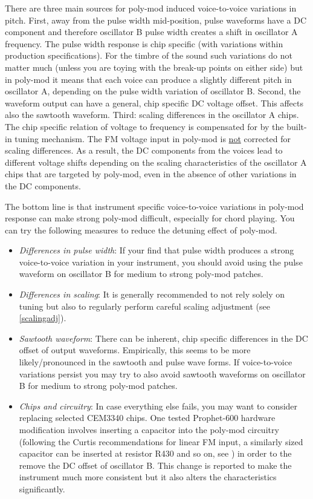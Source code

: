 \documentclass[landscape, 11pt, oneside, twoside]{report}
\newenvironment{flowtext}{\addmargin[0cm]{0cm}}{\endaddmargin} %
\begin{document}
\begin{flowtext}
There are three main sources for poly-mod induced voice-to-voice variations in pitch. First, away from the pulse width mid-position, pulse waveforms have a DC component and therefore oscillator B pulse width creates a shift in oscillator A frequency. The pulse width response is chip specific (with variations within production specifications). For the timbre of the sound such variations do not matter much (unless you are toying with the break-up points on either side) but in poly-mod it means that each voice can produce a slightly different pitch in oscillator A, depending on the pulse width variation of oscillator B. Second, the waveform output can have a general, chip specific DC voltage offset. This affects also the sawtooth waveform. Third: scaling differences in the oscillator A chips. The chip specific relation of voltage to frequency is compensated for by the built-in tuning mechanism. The FM voltage input in poly-mod is \underline{not} corrected for scaling differences. As a result, the DC components from the voices lead to different voltage shifts depending on the scaling characteristics of the oscillator A chips that are targeted by poly-mod, even in the absence of other variations in the DC components. 

The bottom line is that instrument specific voice-to-voice variations in poly-mod response can make strong poly-mod difficult, especially for chord playing. You can try the following measures to reduce the detuning effect of poly-mod. 

\begin{itemize}
  \item \textit{Differences in pulse width}: If your find that pulse width produces a strong voice-to-voice variation in your instrument, you should avoid using the pulse waveform on oscillator B for medium to strong poly-mod patches.      
  \item \textit{Differences in scaling}: It is generally recommended to not rely solely on tuning but also to regularly perform careful scaling adjustment (see \ref{scalingadj}).
  \item \textit{Sawtooth waveform}: There can be inherent, chip specific differences in the DC offset of output waveforms. Empirically, this seems to be more likely/pronounced in the sawtooth and pulse wave forms. If voice-to-voice variations persist you may try to also avoid sawtooth waveforms on oscillator B for medium to strong poly-mod patches.
  \item \textit{Chips and circuitry}: In case everything else fails, you may want to consider replacing selected CEM3340 chips. One tested Prophet-600 hardware modification involves inserting a capacitor into the poly-mod circuitry (following the Curtis recommendations for linear FM input, a similarly sized capacitor can be inserted at resistor R430 and so on, see \cite{p600siservicemanual}) in order to the remove the DC offset of oscillator B. This change is reported to make the instrument much more consistent but it also alters the characteristics significantly.
\end{itemize}


\end{flowtext}
\end{document}
